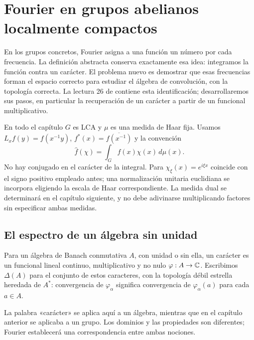 \chapter{Fourier en grupos abelianos localmente compactos}\label{cap:v4-15}
En los grupos concretos, Fourier asigna a una función un número por cada frecuencia. La definición abstracta conserva exactamente esa idea: integramos la función contra un carácter. El problema nuevo es demostrar que esas frecuencias forman el espacio correcto para estudiar el álgebra de convolución, con la topología correcta. La lectura 26 de \cite{valencia4} contiene esta identificación; desarrollaremos sus pasos, en particular la recuperación de un carácter a partir de un funcional multiplicativo.

En todo el capítulo $G$ es LCA y $\mu$ es una medida de Haar fija. Usamos $L_xf(y)=f(x^{-1}y)$, $f^*(x)=\overline{f(x^{-1})}$ y la convención
\[
 \widehat f(\chi)=\int_G f(x)\chi(x)\,d\mu(x).
\]
No hay conjugado en el carácter de la integral. Para $\chi_\xi(x)=e^{i\xi x}$ coincide con el signo positivo empleado antes; una normalización unitaria euclidiana se incorpora eligiendo la escala de Haar correspondiente. La medida dual se determinará en el capítulo siguiente, y no debe adivinarse multiplicando factores sin especificar ambas medidas.

\section{El espectro de un álgebra sin unidad}\label{lectura:v4-26}
\begin{definicion}
Para un álgebra de Banach conmutativa $A$, con unidad o sin ella, un carácter es un funcional lineal continuo, multiplicativo y no nulo $\varphi:A\to\mathbb C$. Escribimos $\Delta(A)$ para el conjunto de estos caracteres, con la topología débil estrella heredada de $A^*$: convergencia de $\varphi_\alpha$ significa convergencia de $\varphi_\alpha(a)$ para cada $a\in A$.
\end{definicion}
La palabra «carácter» se aplica aquí a un álgebra, mientras que en el capítulo anterior se aplicaba a un grupo. Los dominios y las propiedades son diferentes; Fourier establecerá una correspondencia entre ambas nociones.

